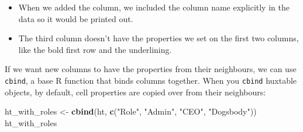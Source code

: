 \documentclass[]{article}
\newenvironment{Shaded}{\begin{snugshade}}{\end{snugshade}}
\newcommand{\KeywordTok}[1]{\textcolor[rgb]{0.13,0.29,0.53}{\textbf{#1}}}
\newcommand{\NormalTok}[1]{#1}
\newcommand{\StringTok}[1]{\textcolor[rgb]{0.31,0.60,0.02}{#1}}
\providecommand{\tightlist}{%
  \setlength{\itemsep}{0pt}\setlength{\parskip}{0pt}}
\begin{document}
\begin{itemize}
\tightlist
\item
  When we added the column, we included the column name explicitly in
  the data so it would be printed out.
\item
  The third column doesn't have the properties we set on the first two
  columns, like the bold first row and the underlining.
\end{itemize}

If we want new columns to have the properties from their neighbours, we
can use \texttt{cbind}, a base R function that binds columns together.
When you \texttt{cbind} huxtable objects, by default, cell properties
are copied over from their neighbours:

\begin{Shaded}
\begin{Highlighting}[]
\NormalTok{ht_with_roles <-}\StringTok{ }\KeywordTok{cbind}\NormalTok{(ht, }\KeywordTok{c}\NormalTok{(}\StringTok{"Role"}\NormalTok{, }\StringTok{"Admin"}\NormalTok{, }\StringTok{"CEO"}\NormalTok{, }\StringTok{"Dogsbody"}\NormalTok{))}
\NormalTok{ht_with_roles}
\end{Highlighting}
\end{Shaded}
\end{document}
